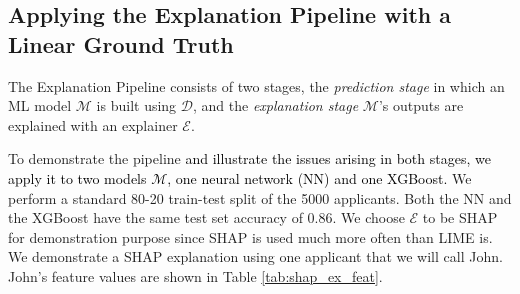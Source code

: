 \documentclass[mnsc,blindrev]{informs3}
\begin{document}
\subsection{Applying the Explanation Pipeline with a Linear Ground Truth}
\label{sec:applying_to_simulated}
The Explanation Pipeline consists of two stages, the \emph{prediction stage} in which an ML model $\mathcal{M}$ is built using $\mathcal{D}$, and the \emph{explanation stage} $\mathcal{M}$'s outputs are explained with an explainer $\mathcal{E}$. 

To demonstrate the pipeline \textcolor{black}{and illustrate the issues arising in both stages, we apply it to two models $\mathcal{M}$, one neural network (NN) and one XGBoost.}%
We perform a standard 80-20 train-test split of the 5000 applicants. Both the NN and the XGBoost have the same test set accuracy of 0.86.
We choose $\mathcal{E}$ to be SHAP for demonstration purpose since SHAP is used much more often than LIME is. %
We demonstrate a SHAP explanation using one applicant that we will call John. %
John's feature values are shown in Table \ref{tab:shap_ex_feat}. %
\end{document}
